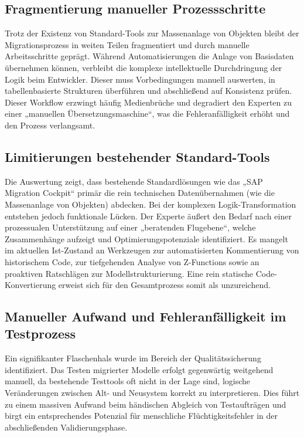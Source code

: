 \subsection{Fragmentierung manueller Prozessschritte}
Trotz der Existenz von Standard-Tools zur Massenanlage von Objekten bleibt der Migrationsprozess in weiten Teilen fragmentiert und durch manuelle Arbeitsschritte geprägt. Während Automatisierungen die Anlage von Basisdaten übernehmen können, verbleibt die komplexe intellektuelle Durchdringung der Logik beim Entwickler. Dieser muss Vorbedingungen manuell auswerten, in tabellenbasierte Strukturen überführen und abschließend auf Konsistenz prüfen. Dieser Workflow erzwingt häufig Medienbrüche und degradiert den Experten zu einer „manuellen Übersetzungsmaschine“, was die Fehleranfälligkeit erhöht und den Prozess verlangsamt.

\subsection{Limitierungen bestehender Standard-Tools}
Die Auswertung zeigt, dass bestehende Standardlösungen wie das „SAP Migration Cockpit“ primär die rein technischen Datenübernahmen (wie die Massenanlage von Objekten) abdecken. Bei der komplexen Logik-Transformation entstehen jedoch funktionale Lücken. Der Experte äußert den Bedarf nach einer prozessualen Unterstützung auf einer „beratenden Flugebene“, welche Zusammenhänge aufzeigt und Optimierungspotenziale identifiziert. Es mangelt im aktuellen Ist-Zustand an Werkzeugen zur automatisierten Kommentierung von historischem Code, zur tiefgehenden Analyse von Z-Functions sowie an proaktiven Ratschlägen zur Modellstrukturierung. Eine rein statische Code-Konvertierung erweist sich für den Gesamtprozess somit als unzureichend.

\subsection{Manueller Aufwand und Fehleranfälligkeit im Testprozess}
Ein signifikanter Flaschenhals wurde im Bereich der Qualitätssicherung identifiziert. Das Testen migrierter Modelle erfolgt gegenwärtig weitgehend manuell, da bestehende Testtools oft nicht in der Lage sind, logische Veränderungen zwischen Alt- und Neusystem korrekt zu interpretieren. Dies führt zu einem massiven Aufwand beim händischen Abgleich von Testaufträgen und birgt ein entsprechendes Potenzial für menschliche Flüchtigkeitsfehler in der abschließenden Validierungsphase.

